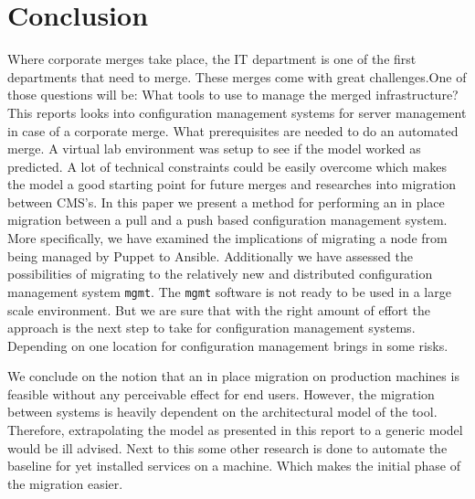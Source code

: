 \section{Conclusion}\label{sec:conclusion}
Where corporate merges take place, the IT department is one of the first departments that need to merge. These merges come with great challenges.One of those questions will be: What tools to use to manage the merged infrastructure? This reports looks into configuration management systems for server management in case of a corporate merge. What prerequisites are needed to do an automated merge. A virtual lab environment was setup to see if the model worked as predicted. A lot of technical constraints could be easily overcome which makes the model a good starting point for future merges and researches into migration between CMS's. In this paper we present a method for performing an in place migration between a pull and a push based configuration management system. More specifically, we have examined the implications of migrating a node from being managed by Puppet to Ansible. Additionally we have assessed the possibilities of migrating to the relatively new and distributed configuration management system \texttt{mgmt}. The \texttt{mgmt} software is not ready to be used in a large scale environment. But we are sure that with the right amount of effort the approach is the next step to take for configuration management systems. Depending on one location for configuration management brings in some risks. 

We conclude on the notion that an in place migration on production machines is feasible without any perceivable effect for end users. However, the migration between systems is heavily dependent on the architectural model of the tool. Therefore, extrapolating the model as presented in this report to a generic model would be ill advised. Next to this some other research is done to automate the baseline for yet installed services on a machine. Which makes the initial phase of the migration easier.  


